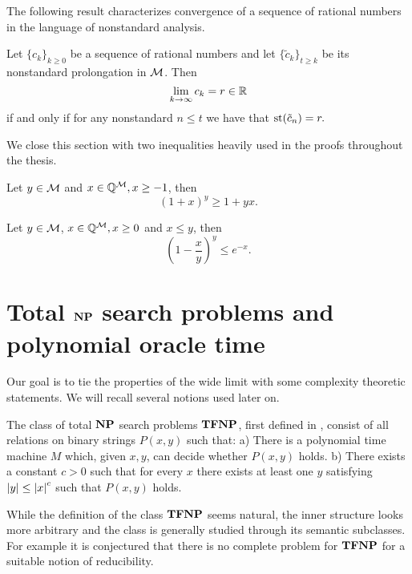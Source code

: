 The following result characterizes convergence of a sequence of rational numbers in the language of nonstandard analysis.

\begin{thrm*}
Let $\{c_k\}_{k\geq 0}$ be a sequence of rational numbers and let $\{\tilde c_k\}_{t\geq k}$ be its nonstandard prolongation in $\mathcal{M}$. Then \[\lim_{k\to\infty}c_k = r \in \mathbb{R}\]
if and only if for any nonstandard $n\leq t$ we have that
$\text{st}(\tilde c_n)=r.$
\end{thrm*}

We close this section with two inequalities heavily used in the proofs throughout the thesis.

\begin{thrm*}
Let $y \in \mathcal{M}$ and $x\in \mathbb{Q}^{\mathcal{M}}, x\geq -1$, then
\[(1+x)^y \geq 1+yx.\]
\end{thrm*}

\begin{thrm*}
Let $y \in \mathcal{M}$, $x\in \mathbb{Q}^{\mathcal{M}}, x\geq 0$ and $x\leq y$, then
\[\left(1-\frac{x}{y}\right)^y \leq e^{-x}.\]
\end{thrm*}

\section*{Total $\textbf{NP}$ search problems and polynomial oracle time}

Our goal is to tie the properties of the wide limit with some complexity theoretic statements. We will recall several notions used later on.

The class of total $\textbf{NP}$ search problems $\textbf{TFNP}$, first defined in \cite{megiddo1991total}, consist of all relations on binary strings $P(x,y)$ such that: a) There is a polynomial time machine $M$ which, given $x,y$, can decide whether $P(x,y)$ holds. b) There exists a constant $c>0$ such that for every $x$ there exists at least one $y$ satisfying $\left|{y}\right|\leq \left|{x}\right|^c$ such that $P(x,y)$ holds.

While the definition of the class $\textbf{TFNP}$ seems natural, the inner structure looks more arbitrary and the class is generally studied through its semantic subclasses. For example it is conjectured that there is no complete problem for $\textbf{TFNP}$ \cite{goldberg2018tfnp} for a suitable notion of reducibility.

